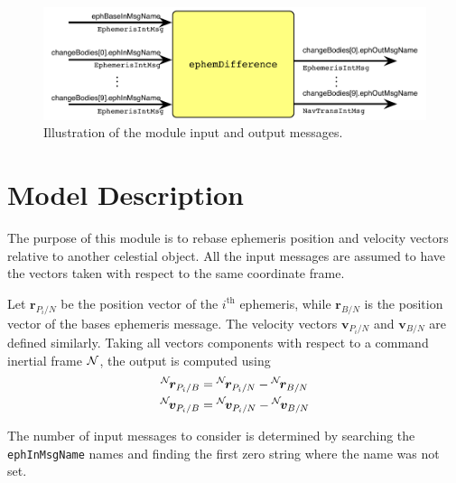 

\begin{figure}[h]
	\centerline{
		\includegraphics{Figures/moduleImg}
	}
	\caption{Illustration of the module input and output messages.}
	\label{fig:moduleImg}
\end{figure}


\section{Model Description}
The purpose of this module is to rebase ephemeris position and velocity vectors relative to another celestial object.  All the input messages are assumed to have the vectors taken with respect to the same coordinate frame.

Let $\bm r_{P_{i}/N}$ be the position vector of the $i^{\text{th}}$ ephemeris, while $\bm r_{B/N}$ is the position vector of the bases ephemeris message.  The velocity vectors $\bm v_{P_{i}/N}$ and $\bm v_{B/N}$ are defined similarly.  Taking all vectors components with respect to a command inertial frame $\cal N$, the output is computed using
\begin{align}
	\leftexp{N}{\bm r}_{P_{i}/B} &= \leftexp{N}{\bm r}_{P_{i}/N} - \leftexp{N}{\bm r}_{B/N}
	\\
	\leftexp{N}{\bm v}_{P_{i}/B} &= \leftexp{N}{\bm v}_{P_{i}/N} - \leftexp{N}{\bm v}_{B/N}
\end{align}

The number of input messages to consider is determined by searching the {\tt ephInMsgName} names and finding the first zero string where the name was not set.  

